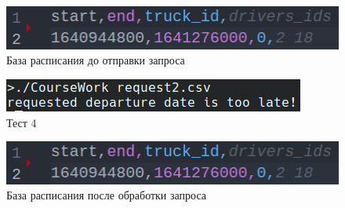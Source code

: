 \begin{figure}[H]
	\centering
	\includegraphics[width=0.7\linewidth]{photo/tests/user/schedule_db_test_1}
	\caption{База расписания до отправки запроса}
	\label{schedule_db_41}
\end{figure}

\begin{figure}[H]
	\centering
	\includegraphics[width=0.7\linewidth]{photo/tests/user/test_4}
	\caption{Тест 4}
	\label{test_4}
\end{figure}

\begin{figure}[H]
	\centering
	\includegraphics[width=0.7\linewidth]{photo/tests/user/schedule_db_test_1}
	\caption{База расписания после обработки запроса}
	\label{schedule_db_42}
\end{figure}
